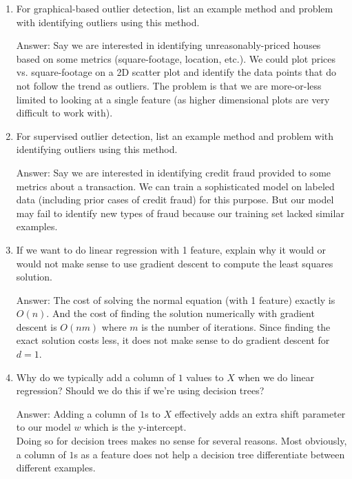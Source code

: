 \documentclass{article}
\newenvironment{answer}{\par\begingroup\color{gre}Answer: }{\endgroup}
\begin{document}
\begin{enumerate}
\item For graphical-based outlier detection, list an example method and problem with identifying outliers using this method.
\begin{answer}
    Say we are interested in identifying unreasonably-priced houses based on some metrics (square-footage, location, etc.). We could plot prices vs. square-footage on a 2D scatter plot and identify the data points that do not follow the trend as outliers. The problem is that we are more-or-less limited to looking at a single feature (as higher dimensional plots are very difficult to work with).
\end{answer}

\item For supervised outlier detection, list an example method and problem with identifying outliers using this method.
\begin{answer}
    Say we are interested in identifying credit fraud provided to some metrics about a transaction. We can train a sophisticated model on labeled data (including prior cases of credit fraud) for this purpose. But our model may fail to identify new types of fraud because our training set lacked similar examples.
\end{answer}

\item If we want to do linear regression with 1 feature, explain why it would or would not make sense to use gradient descent to compute the least squares solution.
\begin{answer}
    The cost of solving the normal equation (with 1 feature) exactly is $O(n)$. And the cost of finding the solution numerically with gradient descent is $O(nm)$ where $m$ is the number of iterations. Since finding the exact solution costs less, it does not make sense to do gradient descent for $d=1$.
\end{answer}

\item Why do we typically add a column of $1$ values to $X$ when we do linear regression? Should we do this if we're using decision trees?
\begin{answer}
    Adding a column of $1$s to $X$ effectively adds an extra shift parameter to our model $w$ which is the y-intercept.\\
    Doing so for decision trees makes no sense for several reasons. Most obviously, a column of $1$s as a feature does not help a decision tree differentiate between different examples.
\end{answer}


\end{enumerate}
\end{document}
